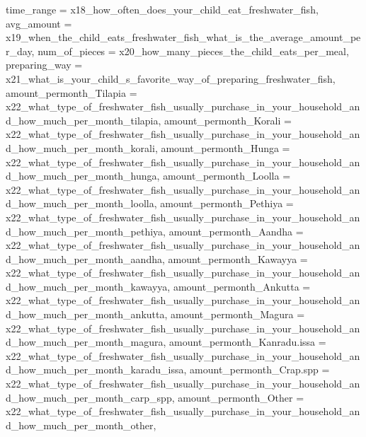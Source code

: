 \documentclass[
]{article}
\newenvironment{Shaded}{\begin{snugshade}}{\end{snugshade}}
\newcommand{\AttributeTok}[1]{\textcolor[rgb]{0.77,0.63,0.00}{#1}}
\newcommand{\NormalTok}[1]{#1}
\begin{document}
\begin{Shaded}
\begin{Highlighting}[]
       \AttributeTok{time\_range =}\NormalTok{  x18\_how\_often\_does\_your\_child\_eat\_freshwater\_fish,}
       \AttributeTok{avg\_amount =}\NormalTok{ x19\_when\_the\_child\_eats\_freshwater\_fish\_what\_is\_the\_average\_amount\_per\_day,}
       \AttributeTok{num\_of\_pieces =}\NormalTok{ x20\_how\_many\_pieces\_the\_child\_eats\_per\_meal,}
       \AttributeTok{preparing\_way =}\NormalTok{ x21\_what\_is\_your\_child\_s\_favorite\_way\_of\_preparing\_freshwater\_fish,}
       \AttributeTok{amount\_permonth\_Tilapia =}\NormalTok{ x22\_what\_type\_of\_freshwater\_fish\_usually\_purchase\_in\_your\_household\_and\_how\_much\_per\_month\_tilapia,}
       \AttributeTok{amount\_permonth\_Korali =}\NormalTok{ x22\_what\_type\_of\_freshwater\_fish\_usually\_purchase\_in\_your\_household\_and\_how\_much\_per\_month\_korali,}
       \AttributeTok{amount\_permonth\_Hunga =}\NormalTok{ x22\_what\_type\_of\_freshwater\_fish\_usually\_purchase\_in\_your\_household\_and\_how\_much\_per\_month\_hunga,}
       \AttributeTok{amount\_permonth\_Loolla =}\NormalTok{ x22\_what\_type\_of\_freshwater\_fish\_usually\_purchase\_in\_your\_household\_and\_how\_much\_per\_month\_loolla,}
       \AttributeTok{amount\_permonth\_Pethiya =}\NormalTok{ x22\_what\_type\_of\_freshwater\_fish\_usually\_purchase\_in\_your\_household\_and\_how\_much\_per\_month\_pethiya,}
       \AttributeTok{amount\_permonth\_Aandha =}\NormalTok{ x22\_what\_type\_of\_freshwater\_fish\_usually\_purchase\_in\_your\_household\_and\_how\_much\_per\_month\_aandha,}
       \AttributeTok{amount\_permonth\_Kawayya =}\NormalTok{ x22\_what\_type\_of\_freshwater\_fish\_usually\_purchase\_in\_your\_household\_and\_how\_much\_per\_month\_kawayya,}
       \AttributeTok{amount\_permonth\_Ankutta =}\NormalTok{ x22\_what\_type\_of\_freshwater\_fish\_usually\_purchase\_in\_your\_household\_and\_how\_much\_per\_month\_ankutta,}
       \AttributeTok{amount\_permonth\_Magura =}\NormalTok{ x22\_what\_type\_of\_freshwater\_fish\_usually\_purchase\_in\_your\_household\_and\_how\_much\_per\_month\_magura,}
       \AttributeTok{amount\_permonth\_Kanradu.issa =}\NormalTok{ x22\_what\_type\_of\_freshwater\_fish\_usually\_purchase\_in\_your\_household\_and\_how\_much\_per\_month\_karadu\_issa,}
       \AttributeTok{amount\_permonth\_Crap.spp =}\NormalTok{ x22\_what\_type\_of\_freshwater\_fish\_usually\_purchase\_in\_your\_household\_and\_how\_much\_per\_month\_carp\_spp,}
       \AttributeTok{amount\_permonth\_Other =}\NormalTok{ x22\_what\_type\_of\_freshwater\_fish\_usually\_purchase\_in\_your\_household\_and\_how\_much\_per\_month\_other,}

\end{Highlighting}
\end{Shaded}
\end{document}
